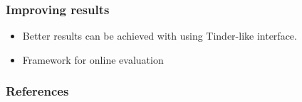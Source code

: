 \documentclass{beamer}
\begin{document}
  \begin{frame}
    \frametitle{Improving results}
    \begin{itemize}
      \item Better results can be achieved with using Tinder-like interface.
      \item Framework for online evaluation
    \end{itemize}
  \end{frame}

  \begin{frame}[allowframebreaks]
    \frametitle{References}
    
    
  \end{frame}
\end{document}

